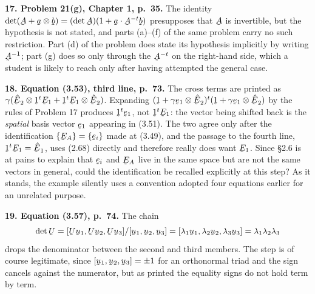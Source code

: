 \documentclass[12pt,a4paper]{article}
\DeclareRobustCommand{\vek}[1]{\underaccent{\tilde}{#1}}
\newcommand{\bu}{\vek{u}}
\newcommand{\bE}{\vek{E}}
\newcommand{\hbE}{\hat{\vek{E}}}
\newcommand{\be}{\vek{e}}
\newcommand{\bA}{\vek{A}}
\newcommand{\ba}{\vek{a}}
\newcommand{\bb}{\vek{b}}
\newcommand{\bU}{\vek{U}}
\newenvironment{query}[1]%
  {\par\medskip\noindent\textbf{#1}\quad}{\par\medskip}
\begin{document}
\begin{query}{17. Problem 21(g), Chapter 1, p.~35.}
The identity $\det(\bA+\ba\otimes\bb)=(\det\bA)(1+\ba\cdot\bA^{-t}\bb)$
presupposes that $\bA$ is invertible, but the hypothesis is not stated,
and parts (a)--(f) of the same problem carry no such restriction. Part (d)
of the problem does state its hypothesis implicitly by writing
$\bA^{-1}$; part (g) does so only through the $\bA^{-t}$ on the
right-hand side, which a student is likely to reach only after having
attempted the general case.
\end{query}

\begin{query}{18. Equation (3.53), third line, p.~73.}
The cross terms are printed as
$\gamma(\hbE_2\otimes\vek{1}^{t}\bE_1+\vek{1}^{t}\bE_1\otimes\hbE_2)$.
Expanding $(\vek{1}+\gamma\be_1\otimes\hbE_2)^{t}
(\vek{1}+\gamma\be_1\otimes\hbE_2)$ by the rules of Problem 17 produces
$\vek{1}^{t}\be_1$, not $\vek{1}^{t}\bE_1$: the vector being shifted back
is the \emph{spatial} basis vector $\be_1$ appearing in (3.51). The two
agree only after the identification $\{\bE_A\}=\{\be_i\}$ made at (3.49),
and the passage to the fourth line, $\vek{1}^{t}\bE_1=\hbE_1$, uses
(2.68) directly and therefore really does want $\bE_1$. Since \S2.6 is at
pains to explain that $\be_i$ and $\bE_A$ live in the same space but are
not the same vectors in general, could the identification be recalled
explicitly at this step? As it stands, the example silently uses a
convention adopted four equations earlier for an unrelated purpose.
\end{query}

\begin{query}{19. Equation (3.57), p.~74.}
The chain
\[
   \det\bU=[\bU\bu_1,\bU\bu_2,\bU\bu_3]/[\bu_1,\bu_2,\bu_3]
   =[\lambda_1\bu_1,\lambda_2\bu_2,\lambda_3\bu_3]=\lambda_1\lambda_2\lambda_3
\]
drops the denominator between the second and third members. The step is
of course legitimate, since $[\bu_1,\bu_2,\bu_3]=\pm1$ for an orthonormal
triad and the sign cancels against the numerator, but as printed the
equality signs do not hold term by term.
\end{query}
\end{document}
